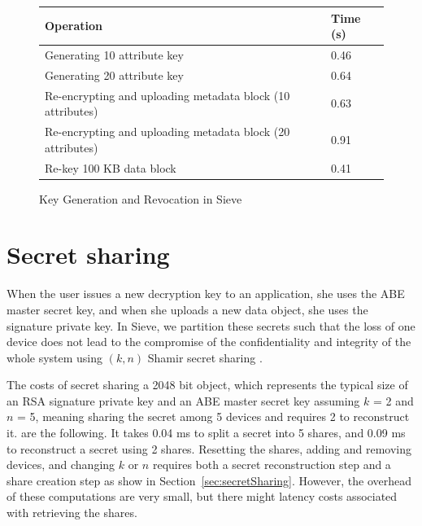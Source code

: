 \begin{figure}
\centering
\begin{tabular}{ |p{5.5cm}|p{1.5cm}| }
\hline
Operation & Time (s)\\ \hline
Generating 10 attribute key &  0.46\\ \hline
Generating 20 attribute key & 0.64\\ \hline
Re-encrypting and uploading metadata block (10 attributes) & 0.63 \\ \hline
Re-encrypting and uploading metadata block (20 attributes) & 0.91 \\ \hline
Re-key 100 KB data block & 0.41 \\ \hline
\end{tabular}
\caption{Key Generation and Revocation in Sieve}
\label{fig:sievekey}
\end{figure}

\section{Secret sharing}

When the user issues a new decryption key to an application,
she uses the ABE master secret key, and when she
uploads a new data object, she uses the signature private key. In Sieve,
we partition these secrets such that the loss of one
device does not lead to the compromise of the confidentiality
and integrity of the whole system using $(k, n)$ Shamir secret sharing .

The costs of secret sharing a 2048 bit object, which represents
the typical size of an RSA signature private key 
and an ABE master secret key assuming $k$ = 2 and $n$ = 5, meaning
sharing the secret among 5 devices and requires 2 to 
reconstruct it. are the following. It takes 0.04 ms to split a secret 
into 5 shares, and 0.09 ms to reconstruct a secret using 2 shares. 
Resetting the shares, 
adding and removing devices, and changing $k$ or $n$ 
requires both a secret reconstruction step and a share creation step
as show in Section~\ref{sec:secretSharing}. However,
the overhead of these computations are very small, but there might 
latency costs associated with retrieving the shares.